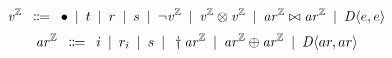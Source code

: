 \[
  \eIL \hquad \Coloneqq\hquad \unit{}
  \hquad|\hquad t
  \hquad|\hquad r
  \hquad|\hquad s
  \hquad|\hquad \neg \eIL
  \hquad|\hquad \eIL \boolFuncs{} \eIL
  \hquad|\hquad \eAR \inequalities{} \eAR 
  \hquad|\hquad \chc[D]{e,e}
\]
\[
  \eAR \hquad \Coloneqq\hquad i
  \hquad|\hquad r_{i}
  \hquad|\hquad s
  \hquad|\hquad \integerUnary \eAR
  \hquad|\hquad \eAR \integerFuncs \eAR
  \hquad|\hquad \chc[D]{ar,ar}
\]



